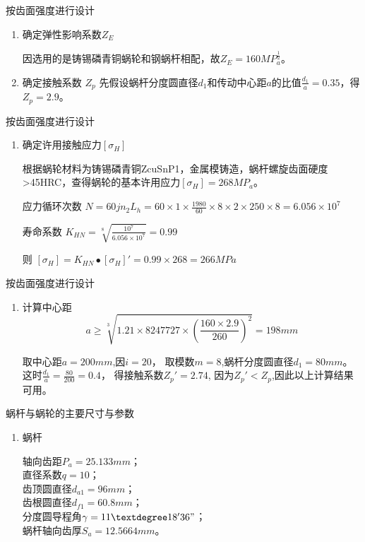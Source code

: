\documentclass[12pt,xcolor={rgb}]{beamer}
\begin{document}
\begin{frame}{按齿面强度进行设计}
	\begin{enumerate}[]
		\item 确定弹性影响系数$Z_E$
		
		因选用的是铸锡磷青铜蜗轮和钢蜗杆相配，故$Z_E=160MP_a^\frac{1}{2}$。
		
		\item 确定接触系数 $Z_p$
		先假设蜗杆分度圆直径$d_1$和传动中心距$a$的比值$\frac{d_1}{a}=0.35$，得$Z_p=2.9$。
		
		
	\end{enumerate}
	
\end{frame}

\begin{frame}{按齿面强度进行设计}
	\begin{enumerate}[]
		
		\item 确定许用接触应力$[\sigma_H]$
		
		根据蜗轮材料为铸锡磷青铜ZcuSnP1，金属模铸造，蜗杆螺旋齿面硬度>45HRC，查得蜗轮的基本许用应力$[\sigma_H]=268MP_a$。
		
		应力循环次数    $N=60jn_2L_h=60\times 1 \times \frac{1980}{60}\times 8 \times 2 \times 250 \times 8 = 6.056\times 10^7$
		
		寿命系数 $K_{HN}=\sqrt[8]{\frac{10^7}{6.056\times 10^7}}=0.99$
		
		则 $[\sigma_H]=K_{HN}\bullet [\sigma_H]'=0.99\times 268 =266MPa$
	
	\end{enumerate}
	
\end{frame}

\begin{frame}{按齿面强度进行设计}
	\begin{enumerate}[]
		
		\item  计算中心距  $$a \geq \sqrt[3] {1.21\times 8247727 \times \left(\frac{160\times 2.9}{260} \right) ^2}=198mm$$
		
		取中心距$a=200mm$,因$i=20$，
		取模数$m=8$,蜗杆分度圆直径$d_1=80mm$。
		这时$\frac{d_1}{a}=\frac{80}{200}=0.4$，
		得接触系数$Z_p'=2.74$,
		因为$Z_p'<Z_p$,因此以上计算结果可用。
	\end{enumerate}
	
\end{frame}


\begin{frame}{蜗杆与蜗轮的主要尺寸与参数}
\begin{enumerate}[]
	\item 蜗杆
	
	轴向齿距$P_a=25.133mm$；\\直径系数$q=10$；\\齿顶圆直径$d_{a1}=96mm$；\\齿根圆直径$d_{f1}=60.8mm$；\\分度圆导程角$\gamma=11\textdegree 18' 36"$；\\蜗杆轴向齿厚$S_a=12.5664mm$。
	
\end{enumerate}
\end{frame}
\end{document}
